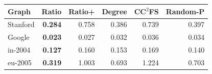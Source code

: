 \begin{tabular}{lrrrrr}
\toprule
Graph & Ratio & Ratio+ & Degree & CC$^2$FS & Random-P \\
\midrule
Stanford & \textbf{0.284} & 0.758 & 0.386 & 0.739 & 0.397 \\
Google & \textbf{0.023} & 0.027 & 0.032 & 0.036 & 0.034 \\
in-2004 & \textbf{0.127} & 0.160 & 0.153 & 0.169 & 0.140 \\
eu-2005 & \textbf{0.319} & 1.003 & 0.693 & 1.224 & 0.703 \\
\bottomrule
\end{tabular}
